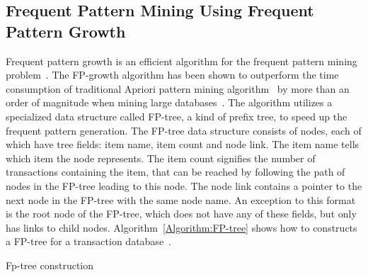 \subsection[Frequent Pattern Mining Using Frequent Pattern Growth]{Frequent Pattern Mining Using Frequent\\ Pattern Growth}

Frequent pattern growth is an efficient algorithm for the frequent pattern mining problem~\cite{Han:2000:MFP:335191.335372}. The FP-growth algorithm has been shown to outperform the time consumption of traditional Apriori pattern mining algorithm~\cite{Agrawal94fastalgorithms} by more than an order of magnitude when mining large databases~\cite{Han:2000:MFP:335191.335372}. The algorithm utilizes a specialized data structure called FP-tree, a kind of prefix tree, to speed up the frequent pattern generation. The FP-tree data structure consists of nodes, each of which have tree fields: item name, item count and node link. The item name tells which item the node represents. The item count signifies the number of transactions containing the item, that can be reached by following the path of nodes in the FP-tree leading to this node. The node link contains a pointer to the next node in the FP-tree with the same node name. An exception to this format is the root node of the FP-tree, which does not have any of these fields, but only has links to child nodes. Algorithm~\ref{Algorithm:FP-tree} shows how to constructs a FP-tree for a transaction database~\cite{Han:2000:MFP:335191.335372}.

\begin{algorithm}[!htbp]
	\SetAlgoLined\DontPrintSemicolon
	\setcounter{AlgoLine}{0}
	\caption{Fp-tree construction}
	\label{Algorithm:FP-tree}
\end{algorithm}  

